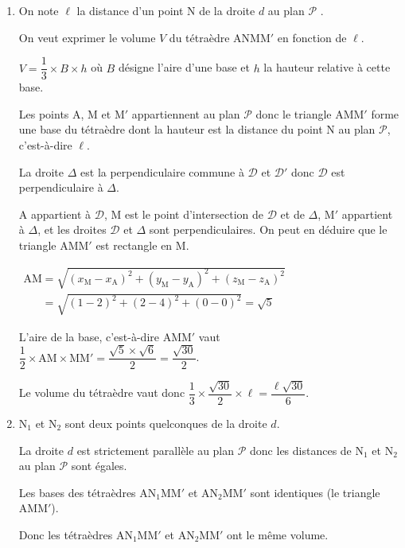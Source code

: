\documentclass[10pt]{article}
\providecommand{\ds}{\displaystyle}
\begin{document}
\begin{enumerate}[resume]
\begin{enumerate}
On a donc $2\times (5t) -(2+5t) -5(1+t)=0$ soit $10t -2-5t-5-5t=0$ ou  $0t=7$.

Le système n'a pas de solution donc la droite $d$ est strictement parallèle à $\mathcal{P}$.
		
		\item On note $\ell$ la distance d'un point N de la droite $d$ au plan $\mathcal{P}$ . 
		
On veut exprimer le volume $V$ du  tétraèdre ANMM$'$ en fonction de $\ell$.

$V = \dfrac13 \times B \times h$ où $B$ désigne l'aire d'une base et $h$ la hauteur relative à cette base.

Les points A, M et M$'$ appartiennent au plan $\mathcal{P}$ donc le triangle AMM$'$ forme une base du tétraèdre dont la hauteur est la distance du point N au plan $\mathcal{P}$, c'est-à-dire $\ell$.

La droite $\Delta$ est la perpendiculaire commune à $\mathcal{D}$ et $\mathcal{D}'$ donc $\mathcal{D}$ est perpendiculaire à $\Delta$.

A appartient à $\mathcal{D}$, M est le point d'intersection de $\mathcal{D}$ et de $\Delta$, M$'$ appartient à $\Delta$, et les droites $\mathcal{D}$ et $\Delta$ sont perpendiculaires. On peut en déduire que le triangle AMM$'$ est rectangle en M.

$\begin{gathered}\text{AM} = \ds\sqrt{(x_{\text{M}} - x_{\text{A}})^2+(y_{\text{M}} - y_{\text{A}})^2+ (z_{\text{M}} - z_{\text{A}})^2}\\
\phantom{\text{AM}}
= \ds\sqrt{(1-2)^2 + (2-4)^2 + (0-0)^2} = \ds\sqrt{5}\end{gathered}$

L'aire de la base, c'est-à-dire AMM$'$ vaut $\dfrac{1}{2}\times\text{AM}\times \text{MM}' = \dfrac{\sqrt{5}\times \sqrt{6}}{2}=\dfrac{\sqrt{30}}{2}$.

Le volume du tétraèdre vaut donc $\dfrac{1}{3}\times \dfrac{\sqrt{30}}{2}\times \ell = \dfrac{\ell\sqrt{30}}{6}$.

		\item N$_1$ et N$_2$ sont deux points quelconques de la droite $d$.
		
La droite $d$ est strictement parallèle au plan $\mathcal{P}$ donc les distances de N$_1$ et N$_2$ au plan $\mathcal{P}$ sont égales.

Les bases des  tétraèdres AN$_1$MM$'$ et AN$_2$MM$'$ sont identiques (le triangle AMM$'$).

Donc les tétraèdres AN$_1$MM$'$ et AN$_2$MM$'$ ont le même volume.
		
	\end{enumerate}
\end{enumerate}
\end{document}
